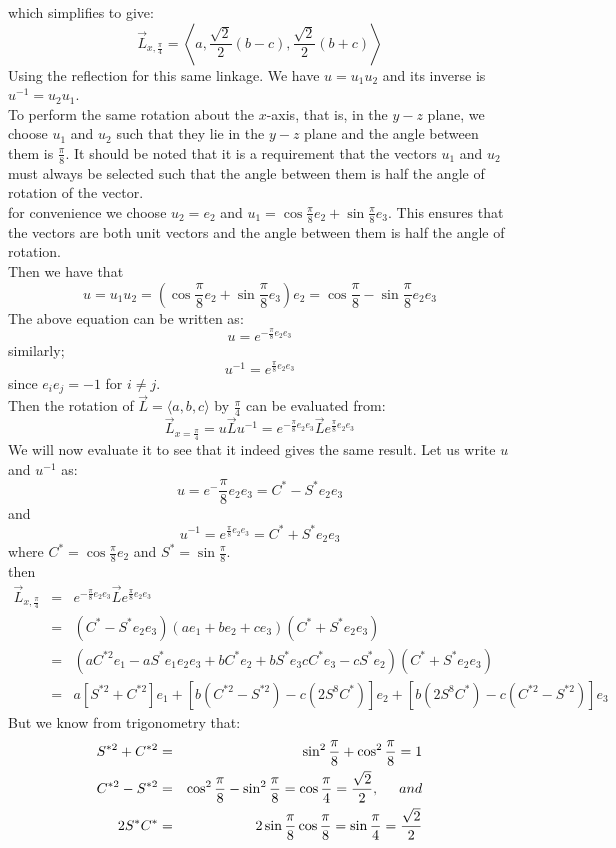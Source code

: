 \documentclass[12pt,onecolumn,letterpaper]{article} %
\begin{document}
which simplifies to give:
$$\vec{L}_{x,\frac{\pi}{4}}=\left\langle a, \frac{\sqrt{2}}{2}(b-c), \frac{\sqrt{2}}{2}(b+c)\right\rangle$$
Using the reflection for this same linkage. We have $u=u_1u_2$ and its inverse is $u^{-1}=u_2u_1$.\\
To perform the same rotation about the $x$-axis, that is, in the $y-z$ plane, we choose $u_1$ and $u_2$ such that they lie in the $y-z$ plane and the angle between them is $\frac{\pi}{8}$. It should be noted that it is a requirement that the vectors $u_1$ and $u_2$ must always be selected such that the angle between them is half the angle of rotation of the vector.\\
for convenience we choose $u_2=e_2$ and $u_1=\cos\frac{\pi}{8}e_2+\sin\frac{\pi}{8}e_3$. This ensures that the vectors are both unit vectors and the angle between them is half the angle of rotation.\\
Then we have that
$$u=u_1u_2=\left(\cos\frac{\pi}{8}e_2+\sin\frac{\pi}{8}e_3\right)e_2=\cos\frac{\pi}{8}-\sin\frac{\pi}{8}e_2e_3$$
The above equation can be written as:
\begin{equation}
    u=e^{-\frac{\pi}{8}e_2e_3}
\end{equation}
similarly;
\begin{equation}
    u^{-1}=e^{\frac{\pi}{8}e_2e_3}
\end{equation}
since $e_ie_j=-1$ for $i\neq j$.\\
Then the rotation of $\vec{L}=\langle a,b,c\rangle$ by $\frac{\pi}{4}$ can be evaluated from:
$$\vec{L}_{x=\frac{\pi}{4}}=u\vec{L}u^{-1}=e^{-\frac{\pi}{8}e_2e_3}\vec{L}e^{\frac{\pi}{8}e_2e_3}$$
We will now evaluate it to see that it indeed gives the same result. Let us write $u$ and $u^{-1}$ as:
 $$u=e^-{\frac{\pi}{8}e_2e_3}=C^*-S^*e_2e_3$$ and 
  $$u^{-1}=e^{\frac{\pi}{8}e_2e_3}=C^*+S^*e_2e_3$$
  where $C^*=\cos\frac{\pi}{8}e_2$ and $S^*=\sin\frac{\pi}{8}$.\\
  then
\begin{eqnarray*}
\vec{L}_{x,\frac{\pi}{4}} & = & e^{-\frac{\pi}{8}e_2e_3}\vec{L}e^{\frac{\pi}{8}e_2e_3}\\
&=& (C^*-S^*e_2e_3)(ae_1+be_2+ce_3)(C^*+S^*e_2e_3)\\
&=& (aC^{*2}e_1-aS^*e_1e_2e_3+bC^*e_2+bS^*e_3cC^*e_3-cS^*e_2)(C^*+S^*e_2e_3)\\
&=& a\left[S^{*2}+C^{*2}\right]e_1+\left[b(C^{*2}-S^{*2})-c(2S^8C^*)\right]e_2+\left[b(2S^8C^*)-c(C^{*2}-S^{*2})\right]e_3
\end{eqnarray*}
But we know from trigonometry that:
\begin{eqnarray*}
S^{*2}+C^{*2}&=&\sin^2{\frac{\pi}{8}}+\cos^2{\frac{\pi}{8}}=1\\
C^{*2}-S^{*2}&=&\cos^2{\frac{\pi}{8}}-\sin^2{\frac{\pi}{8}}=\cos{\frac{\pi}{4}}=\frac{\sqrt{2}}{2}, \hspace{.5cm}and\\
2S^{*}C^{*}&=&2\sin{\frac{\pi}{8}}\cos{\frac{\pi}{8}}=\sin{\frac{\pi}{4}}=\frac{\sqrt{2}}{2}
\end{eqnarray*}
\end{document}
